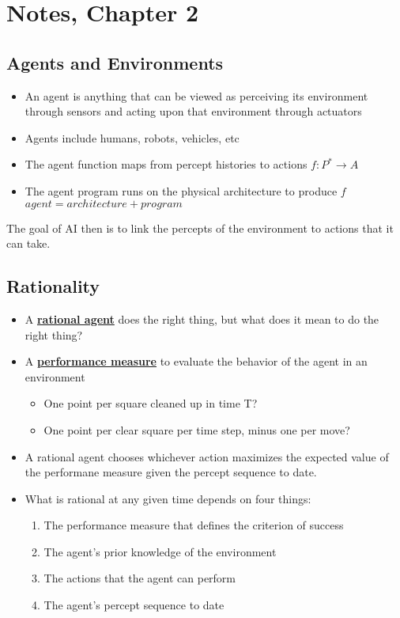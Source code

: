 \documentclass[12pt]{article}
\newcommand{\definition}[1]{\underline{\textbf{#1}}}
\begin{document}
\section*{Notes, Chapter 2}

\subsection*{Agents and Environments}

\begin{itemize}
    \item An agent is anything that can be viewed as perceiving its environment through sensors and acting upon that environment through actuators
    \item Agents include humans, robots, vehicles, etc
    \item The agent function maps from percept histories to actions $ f: P^* \to A$
    \item The agent program runs on the physical architecture to produce $f$ \\ $agent = architecture + program$
\end{itemize}

The goal of AI then is to link the percepts of the environment to actions that it can take.


\subsection*{Rationality}

\begin{itemize}
    \item A \definition{rational agent} does the right thing, but what does it mean to do the right thing?
    \item A \definition{performance measure} to evaluate the behavior of the agent in an environment
    \begin{itemize}
        \item One point per square cleaned up in time T?
        \item One point per clear square per time step, minus one per move?
    \end{itemize}
    \item A rational agent chooses whichever action maximizes the expected value of the performane measure given the percept sequence to date.
    \item What is rational at any given time depends on four things:
    \begin{enumerate}
        \item The performance measure that defines the criterion of success
        \item The agent's prior knowledge of the environment
        \item The actions that the agent can perform
        \item The agent's percept sequence to date
    \end{enumerate}

\end{itemize}
\end{document}
